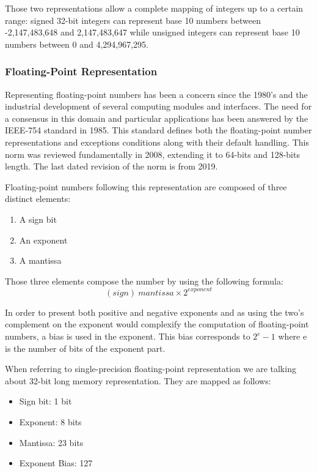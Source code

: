 Those two representations allow a complete mapping of integers up to a certain range: signed 32-bit integers can represent base 10 numbers between -2,147,483,648 and 2,147,483,647 while unsigned integers can represent base 10 numbers between 0 and 4,294,967,295.

\subsubsection{Floating-Point Representation}

Representing floating-point numbers has been a concern since the 1980's and the industrial development of several computing modules and interfaces. The need for a consensus in this domain and particular applications has been answered by the IEEE-754 standard \cite{Ieee754} in 1985. This standard defines both the floating-point number representations and exceptions conditions along with their default handling. This norm was reviewed fundamentally in 2008, extending it to 64-bits and 128-bits length. The last dated revision of the norm is from 2019.

Floating-point numbers following this representation are composed of three distinct elements:
\begin{enumerate}
  \item A sign bit
  \item An exponent
  \item A mantissa
\end{enumerate}

Those three elements compose the number by using the following formula:
\begin{equation}
  (sign)\ mantissa \times 2^{exponent}
\end{equation}

In order to present both positive and negative exponents and as using the two's complement on the exponent would complexify the computation of floating-point numbers, a bias is used in the exponent. This bias corresponds to $2^e - 1$ where e is the number of bits of the exponent part.

When referring to single-precision floating-point representation we are talking about 32-bit long memory representation. They are mapped as follows:
\begin{itemize}
  \item Sign bit: 1 bit
  \item Exponent: 8 bits
  \item Mantissa: 23 bits
  \item Exponent Bias: 127
\end{itemize}

